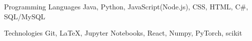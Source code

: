 


\begin{cvskills}


\cvskill
{Programming Languages} %
{Java, Python, JavaScript(Node.js), CSS, HTML, C\#, SQL/MySQL} %


\cvskill
{Technologies} %
{Git, \textrm{\LaTeX}, Jupyter Notebooks, React, Numpy, PyTorch, scikit} %





\end{cvskills}